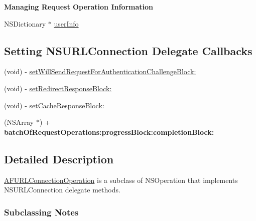 \begin{Indent}{\bf Managing Request Operation Information}\par
{\em 

 

 }\begin{DoxyCompactItemize}
\item 
N\+S\+Dictionary $\ast$ \hyperlink{interface_a_f_u_r_l_connection_operation_a9e684ec568c6dd79497ef36b84511d15}{user\+Info}
\end{DoxyCompactItemize}
\end{Indent}
\subsection*{Setting N\+S\+U\+R\+L\+Connection Delegate Callbacks}
\label{_amgrp784111e69b3f1d523411e11cf76aebe4}%


 

 \begin{DoxyCompactItemize}
\item 
(void) -\/ \hyperlink{interface_a_f_u_r_l_connection_operation_abd794cb33392cddde55bbbfc86e92b68}{set\+Will\+Send\+Request\+For\+Authentication\+Challenge\+Block\+:}
\item 
(void) -\/ \hyperlink{interface_a_f_u_r_l_connection_operation_af43833a7d85fbe87089d83ddeb8ef5bd}{set\+Redirect\+Response\+Block\+:}
\item 
(void) -\/ \hyperlink{interface_a_f_u_r_l_connection_operation_a84e31d7de3c504d9adf3d8a0e3ca38a4}{set\+Cache\+Response\+Block\+:}
\item 
\hypertarget{interface_a_f_u_r_l_connection_operation_af80ddc817c71f1bba1084d94f2b088bd}{}(N\+S\+Array $\ast$) + {\bfseries batch\+Of\+Request\+Operations\+:progress\+Block\+:completion\+Block\+:}\label{interface_a_f_u_r_l_connection_operation_af80ddc817c71f1bba1084d94f2b088bd}

\end{DoxyCompactItemize}


\subsection{Detailed Description}
{\ttfamily \hyperlink{interface_a_f_u_r_l_connection_operation}{A\+F\+U\+R\+L\+Connection\+Operation}} is a subclass of {\ttfamily N\+S\+Operation} that implements {\ttfamily N\+S\+U\+R\+L\+Connection} delegate methods.

\subsubsection*{Subclassing Notes}

